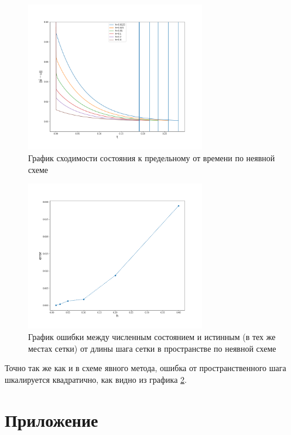 \begin{figure}
\centering
\includegraphics[width=0.7\textwidth]{impl_t1.png}
\caption{График сходимости состояния к предельному от времени по неявной схеме}
\label{fig:impl_t1}
\end{figure} 

\begin{figure}
\centering
\includegraphics[width=0.7\textwidth]{impl_err.png}
\caption{График ошибки между численным состоянием и истинным (в тех же местах сетки) от длины шага сетки в пространстве по неявной схеме}
\label{fig:impl_err}
\end{figure} 

Точно так же как и в схеме явного метода, ошибка от пространственного шага шкалируется квадратично, как видно из графика \ref{fig:impl_err}.

\newpage

\section{Приложение}

